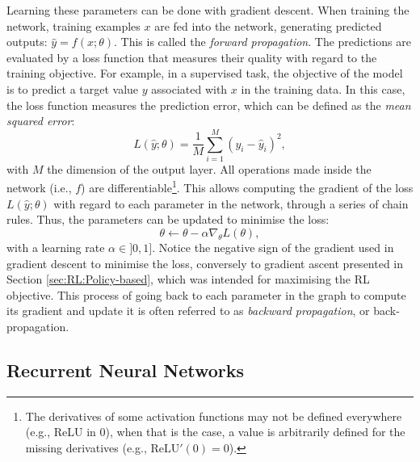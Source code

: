 Learning these parameters can be done with gradient descent. When training the network, training examples $x$ are fed into the network, generating predicted outputs: $\widehat{y}=f(x;\theta)$. This is called the \textit{forward propagation}. The predictions are evaluated by a loss function that measures their quality with regard to the training objective. For example, in a supervised task, the objective of the model is to predict a target value $y$ associated with $x$ in the training data. In this case, the loss function measures the prediction error, which can be defined as the \textit{mean squared error}:
\begin{equation}
    L(\widehat{y};\theta)=\frac{1}{M}\sum_{i=1}^M(y_i-\widehat{y}_i)^2,
\end{equation}
with $M$ the dimension of the output layer. All operations made inside the network (i.e., $f$) are differentiable\footnote{The derivatives of some activation functions may not be defined everywhere (e.g., ReLU in 0), when that is the case, a value is arbitrarily defined for the missing derivatives (e.g., $\text{ReLU}'(0)=0$).}. This allows computing the gradient of the loss $L(\widehat{y};\theta)$ with regard to each parameter in the network, through a series of chain rules. Thus, the parameters can be updated to minimise the loss:
\begin{equation}
    \theta\leftarrow\theta-\alpha\nabla_\theta L(\theta),
\end{equation}
with a learning rate $\alpha\in]0,1]$. Notice the negative sign of the gradient used in gradient descent to minimise the loss, conversely to gradient ascent presented in Section \ref{sec:RL:Policy-based}, which was intended for maximising the RL objective. This process of going back to each parameter in the graph to compute its gradient and update it is often referred to as \textit{backward propagation}, or back-propagation.







\subsection{Recurrent Neural Networks}\label{sec:NN:RNN}

